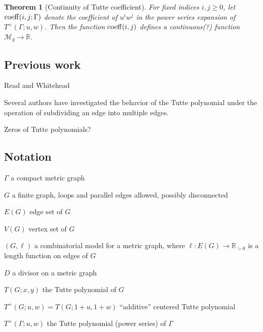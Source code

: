 \documentclass{amsart}
\newtheorem{thm}{Theorem}
\theoremstyle{definition}
\newcommand{\RR}{\mathbb{R}}
\begin{document}
\begin{thm}[Continuity of Tutte coefficient]
For fixed indices $i,j\geq 0$,
let ${\rm coeff}(i,j; \Gamma)$
denote the coefficient of $u^i w^j$ in the power series expansion of $T^+(\Gamma; u,w)$.
Then the function ${\rm coeff}(i,j)$
defines a continuous(?) 
function $\mathcal M_g \to \RR$.
\end{thm}

\subsection{Previous work} 

Read and Whitehead \cite{RW2}

Several authors have investigated the behavior of the Tutte polynomial under the operation of subdividing an edge into multiple edges.

Zeros of Tutte polynomials?

\subsection{Notation}

$\Gamma$ a compact metric graph

$G$ a finite graph, 
loops and parallel edges allowed,
possibly disconnected

$E(G)$ edge set of $G$

$V(G)$ vertex set of $G$

$(G,\ell)$ a combinatorial model for a metric graph,
where 
$\ell : E(G) \to \RR_{>0}$
is a length function on edges of $G$

$D$ a divisor on a metric graph

$T(G; x,y)$ the Tutte polynomial of $G$

$T^{+}(G; u,w) = T(G; 1+u,1+w)$ ``additive'' centered Tutte polynomial

$T^\times(\Gamma; u,w)$ the Tutte polynomial  (power series) of $\Gamma$



\end{document}
